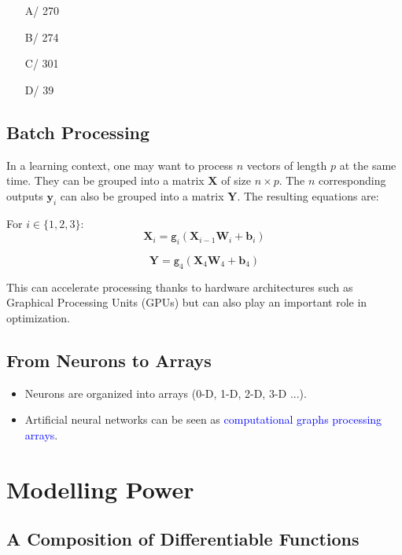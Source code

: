 \documentclass{book}
\newcommand{\y}{\mathbf{y}}
\newcommand{\X}{\mathbf{X}}
\newcommand{\Y}{\mathbf{Y}}
\newcommand{\W}{\mathbf{W}} %
\newcommand{\bias}{\mathbf{b}}%
\newcommand{\act}{\texttt{g}}%
\begin{document}
\begin{itemize}
\item[A/] 270
\item[B/] 274
\item[C/] 301
\item[D/] 39
\end{itemize}

\subsection{Batch Processing}

In a learning context, one may want to process $n$ vectors of length $p$ at the same time. They can be grouped into a matrix $\mathbf{X}$ of size $n \times p$. The $n$ corresponding outputs $\y_i$ can also be grouped into a matrix $\Y$. The resulting equations are:

\begin{block}{}
For $i \in \{1, 2, 3\}$:
\[
\X_i = \act_i(\X_{i-1}\W_i + \bias_i)
\]
\end{block}

\begin{block}{}
\[
\Y = \act_4(\X_4\W_4 + \bias_4)
\]
\end{block}

This can accelerate processing thanks to hardware architectures such as Graphical Processing Units (GPUs) but can also play an important role in optimization.

\subsection{From Neurons to Arrays}

\begin{itemize}
\item Neurons are organized into arrays (0-D, 1-D, 2-D, 3-D ...).
\item Artificial neural networks can be seen as \textcolor{blue}{computational graphs processing arrays}.
\end{itemize}

\section{Modelling Power}

\subsection{A Composition of Differentiable Functions}
\end{document}
